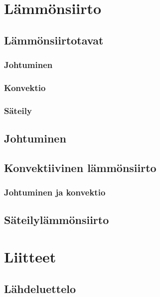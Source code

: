\documentclass[12pt,a4paper,finnish]{book}
\begin{document}
\part{Lämmönsiirto} %

\chapter{Lämmönsiirtotavat}
\section{Johtuminen}
\section{Konvektio}
\section{Säteily}

\chapter{Johtuminen}

\chapter{Konvektiivinen lämmönsiirto}
\section{Johtuminen ja konvektio}

\chapter{Säteilylämmönsiirto}

\part*{Liitteet} %

\chapter{Lähdeluettelo} %

{}

\end{document}
